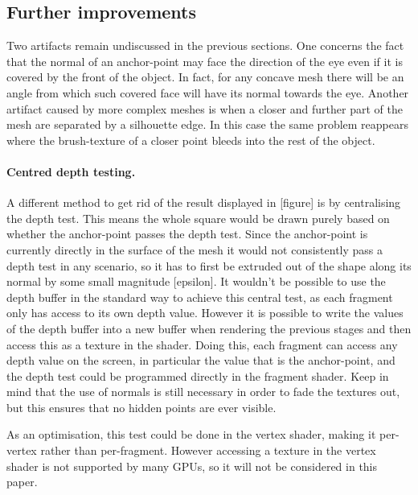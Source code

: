 \documentclass[a4paper, 12pt]{article}
\begin{document}
\subsection{Further improvements}
Two artifacts remain undiscussed in the previous sections. One concerns the fact that the normal of an anchor-point may face the direction of the eye even if it is covered by the front of the object. In fact, for any concave mesh there will be an angle from which such covered face will have its normal towards the eye. Another artifact caused by more complex meshes is when a closer and further part of the mesh are separated by a silhouette edge. In this case the same problem reappears where the brush-texture of a closer point bleeds into the rest of the object.

\paragraph{Centred depth testing.}
A different method to get rid of the result displayed in [figure] is by centralising the depth test. This means the whole square would be drawn purely based on whether the anchor-point passes the depth test. Since the anchor-point is currently directly in the surface of the mesh it would not consistently pass a depth test in any scenario, so it has to first be extruded out of the shape along its normal by some small magnitude [epsilon]. It wouldn't be possible to use the depth buffer in the standard way to achieve this central test, as each fragment only has access to its own depth value. However it is possible to write the values of the depth buffer into a new buffer when rendering the previous stages and then access this as a texture in the shader. Doing this, each fragment can access any depth value on the screen, in particular the value that is the anchor-point, and the depth test could be programmed directly in the fragment shader. Keep in mind that the use of normals is still necessary in order to fade the textures out, but this ensures that no hidden points are ever visible.

As an optimisation, this test could be done in the vertex shader, making it per-vertex rather than per-fragment. However accessing a texture in the vertex shader is not supported by many GPUs, so it will not be considered in this paper.
\end{document}

